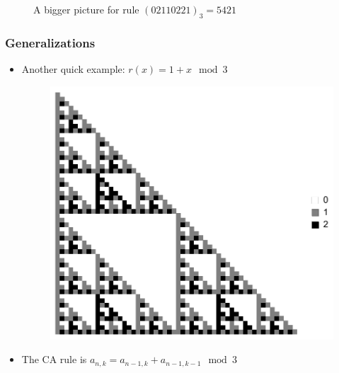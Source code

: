 \documentclass{beamer}
\begin{document}
\begin{frame}
\begin{figure}
        \caption{A bigger picture for rule $(02110221)_3 = 5421$}
    \end{figure}
\end{frame}

\begin{frame}
    \frametitle{Generalizations}
    \begin{itemize}
        \item Another quick example: $r(x) = 1 + x \mod 3$
        \begin{figure}
            \centering 
            \includegraphics[scale=0.5]{PascalCAMod3.pdf}
        \end{figure}
        \item The CA rule is $a_{n,k} = a_{n-1,k} + a_{n-1,k-1} \mod 3$
    \end{itemize}
\end{frame}
\end{document}
